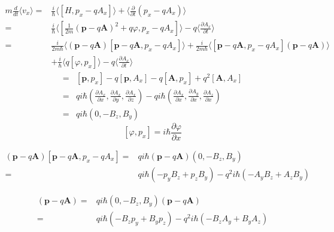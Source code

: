 \begin{enumerate}
        \begin{align*}
            m\frac{d}{dt}\langle v_x\rangle
            =&
            \frac{i}{\hbar}
            \langle[H, p_x-qA_x]\rangle+
            \langle \frac{\partial}{\partial t}(p_x-qA_x)\rangle\\
            =&
            \frac{i}{\hbar}
            \langle[\frac{1}{2m}( \bm{p}-q\bm{A})^2+q\varphi, p_x-qA_x]\rangle-q
            \langle \frac{\partial A_x}{\partial t}\rangle\\
            =&
             \frac{i}{2m\hbar}
             \langle( \bm{p}-q\bm{A})
             [ \bm{p}-q\bm{A},p_x-qA_x]
             \rangle
             +
              \frac{i}{2m\hbar}
              \langle
               [ \bm{p}-q\bm{A},p_x-qA_x]
               ( \bm{p}-q\bm{A})
               \rangle\\ & +
             \frac{i}{\hbar}
            \langle q[\varphi,p_x]\rangle-q
            \langle \frac{\partial A_x}{\partial t}\rangle
        \end{align*}
        \begin{align*}
            [ \bm{p}-q\bm{A},p_x-qA_x] = & [\bm p, p_x] - q[\bm p, A_x] - q[\bm A, p_x] + q^2[\bm A, A_x]\\
            =& qi\hbar (\frac{\partial A_x}{\partial x},\frac{\partial A_x}{\partial y}, \frac{\partial A_x}{\partial z})
            -qi\hbar(\frac{\partial A_x}{\partial x}, \frac{\partial A_y}{\partial x}, \frac{\partial A_z}{\partial x})\\
            =&qi\hbar(0,-B_z, B_y)
        \end{align*}
        $$
        [\varphi,p_x] = i\hbar \frac{\partial \varphi}{\partial x}
        $$

        \begin{align*}
            ( \bm{p}-q\bm{A})
             [ \bm{p}-q\bm{A},p_x-qA_x]
            = & 
            qi\hbar  ( \bm{p}-q\bm{A})(0,-B_z, B_y)\\
            =&qi\hbar(-p_yB_z+p_zB_y)-q^2i\hbar(-A_yB_z+A_zB_y)
        \end{align*}

        \begin{align*}
           [ \bm{p}-q\bm{A},p_x-qA_x] ( \bm{p}-q\bm{A})
            = & 
            qi\hbar (0,-B_z, B_y) ( \bm{p}-q\bm{A})\\
            =&qi\hbar(-B_zp_y+B_yp_z)-q^2i\hbar(-B_zA_y+B_yA_z)
        \end{align*}


\end{enumerate}
